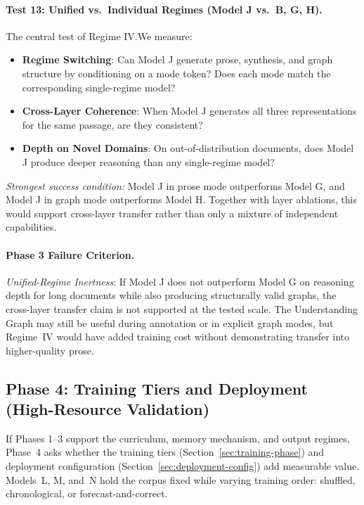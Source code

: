 \paragraph{Test 13: Unified vs.\ Individual Regimes (Model J vs.\ B, G, H).}
The central test of Regime IV.\@ We measure:
\begin{itemize}
    \item \textbf{Regime Switching}: Can Model J generate prose, synthesis,
    and graph structure by conditioning on a mode token? Does each mode
    match the corresponding single-regime model?
    \item \textbf{Cross-Layer Coherence}: When Model J generates all three
    representations for the same passage, are they consistent?
    \item \textbf{Depth on Novel Domains}: On out-of-distribution documents,
    does Model J produce deeper reasoning than any single-regime model?
\end{itemize}
\emph{Strongest success condition:} Model J in prose mode outperforms
Model G, and Model J in graph mode outperforms Model H. Together with layer
ablations, this would support cross-layer transfer rather than only a mixture of
independent capabilities.

\paragraph{Phase 3 Failure Criterion.}
\emph{Unified-Regime Inertness}: If Model J does not outperform Model G on
reasoning depth for long documents while also producing structurally valid
graphs, the cross-layer transfer claim is not supported at the tested scale.
The Understanding Graph may still be useful during annotation or in explicit
graph modes, but Regime~IV would have added training cost without demonstrating
transfer into higher-quality prose.


\subsection{Phase 4: Training Tiers and Deployment (High-Resource Validation)}\label{sec:phase4}

If Phases 1--3 support the curriculum, memory mechanism, and output regimes,
Phase~4 asks whether the training tiers (Section~\ref{sec:training-phase}) and
deployment configuration (Section~\ref{sec:deployment-config}) add measurable
value. Models~L, M, and~N hold the corpus fixed while varying training order:
shuffled, chronological, or forecast-and-correct.

